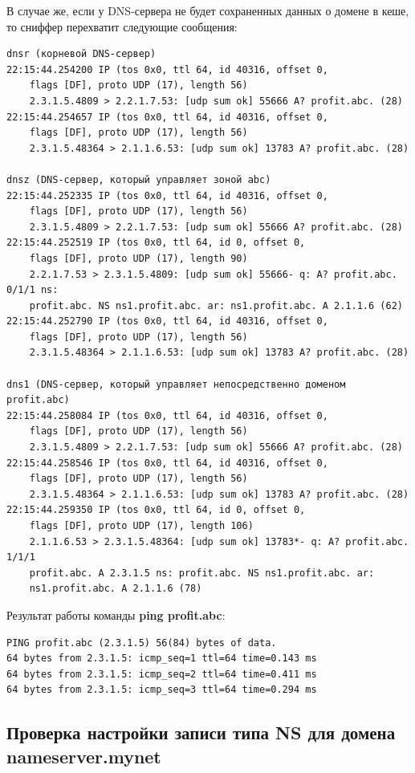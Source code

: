 \documentclass[a4paper,12pt]{article}
\begin{document}
В случае же, если у DNS-сервера не будет сохраненных данных о домене в кеше, то сниффер перехватит следующие сообщения:
\begin{verbatim}
dnsr (корневой DNS-сервер)
22:15:44.254200 IP (tos 0x0, ttl 64, id 40316, offset 0, 
	flags [DF], proto UDP (17), length 56) 
	2.3.1.5.4809 > 2.2.1.7.53: [udp sum ok] 55666 A? profit.abc. (28)
22:15:44.254657 IP (tos 0x0, ttl 64, id 40316, offset 0, 
	flags [DF], proto UDP (17), length 56) 
	2.3.1.5.48364 > 2.1.1.6.53: [udp sum ok] 13783 A? profit.abc. (28)

dnsz (DNS-сервер, который управляет зоной abc)
22:15:44.252335 IP (tos 0x0, ttl 64, id 40316, offset 0, 
	flags [DF], proto UDP (17), length 56) 
	2.3.1.5.4809 > 2.2.1.7.53: [udp sum ok] 55666 A? profit.abc. (28)
22:15:44.252519 IP (tos 0x0, ttl 64, id 0, offset 0, 
	flags [DF], proto UDP (17), length 90) 
	2.2.1.7.53 > 2.3.1.5.4809: [udp sum ok] 55666- q: A? profit.abc. 0/1/1 ns: 
	profit.abc. NS ns1.profit.abc. ar: ns1.profit.abc. A 2.1.1.6 (62)
22:15:44.252790 IP (tos 0x0, ttl 64, id 40316, offset 0, 
	flags [DF], proto UDP (17), length 56) 
	2.3.1.5.48364 > 2.1.1.6.53: [udp sum ok] 13783 A? profit.abc. (28)

dns1 (DNS-сервер, который управляет непосредственно доменом profit.abc)
22:15:44.258084 IP (tos 0x0, ttl 64, id 40316, offset 0, 
	flags [DF], proto UDP (17), length 56) 
	2.3.1.5.4809 > 2.2.1.7.53: [udp sum ok] 55666 A? profit.abc. (28)
22:15:44.258546 IP (tos 0x0, ttl 64, id 40316, offset 0, 
	flags [DF], proto UDP (17), length 56) 
	2.3.1.5.48364 > 2.1.1.6.53: [udp sum ok] 13783 A? profit.abc. (28)
22:15:44.259350 IP (tos 0x0, ttl 64, id 0, offset 0, 
	flags [DF], proto UDP (17), length 106) 
	2.1.1.6.53 > 2.3.1.5.48364: [udp sum ok] 13783*- q: A? profit.abc. 1/1/1 
	profit.abc. A 2.3.1.5 ns: profit.abc. NS ns1.profit.abc. ar: 
	ns1.profit.abc. A 2.1.1.6 (78)
\end{verbatim}

Результат работы команды \textbf{ping profit.abc}:
\begin{verbatim}
PING profit.abc (2.3.1.5) 56(84) bytes of data.
64 bytes from 2.3.1.5: icmp_seq=1 ttl=64 time=0.143 ms
64 bytes from 2.3.1.5: icmp_seq=2 ttl=64 time=0.411 ms
64 bytes from 2.3.1.5: icmp_seq=3 ttl=64 time=0.294 ms
\end{verbatim}

\subsection{Проверка настройки записи типа NS для домена nameserver.mynet}
\end{document}
